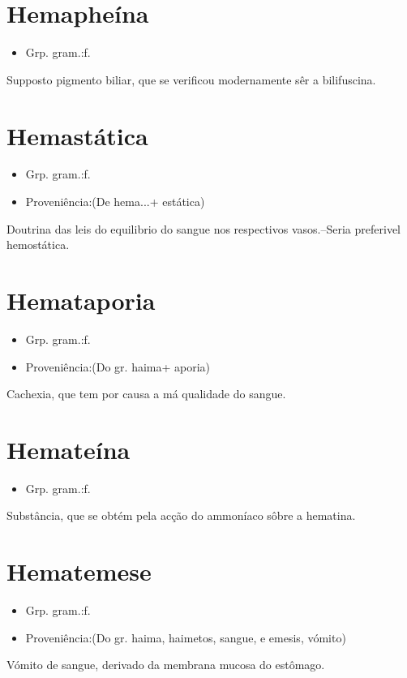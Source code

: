 \documentclass{article}
\begin{document}
\section{Hemapheína}
\begin{itemize}
\item {Grp. gram.:f.}
\end{itemize}
Supposto pigmento biliar, que se verificou modernamente sêr a \textunderscore bilifuscina\textunderscore .
\section{Hemastática}
\begin{itemize}
\item {Grp. gram.:f.}
\end{itemize}
\begin{itemize}
\item {Proveniência:(De \textunderscore hema...\textunderscore  + \textunderscore estática\textunderscore )}
\end{itemize}
Doutrina das leis do equilibrio do sangue nos respectivos vasos.--Seria preferivel \textunderscore hemostática\textunderscore .
\section{Hemataporia}
\begin{itemize}
\item {Grp. gram.:f.}
\end{itemize}
\begin{itemize}
\item {Proveniência:(Do gr. \textunderscore haima\textunderscore  + \textunderscore aporia\textunderscore )}
\end{itemize}
Cachexia, que tem por causa a má qualidade do sangue.
\section{Hemateína}
\begin{itemize}
\item {Grp. gram.:f.}
\end{itemize}
Substância, que se obtém pela acção do ammoníaco sôbre a hematina.
\section{Hematemese}
\begin{itemize}
\item {Grp. gram.:f.}
\end{itemize}
\begin{itemize}
\item {Proveniência:(Do gr. \textunderscore haima\textunderscore , \textunderscore haimetos\textunderscore , sangue, e \textunderscore emesis\textunderscore , vómito)}
\end{itemize}
Vómito de sangue, derivado da membrana mucosa do estômago.
\end{document}
